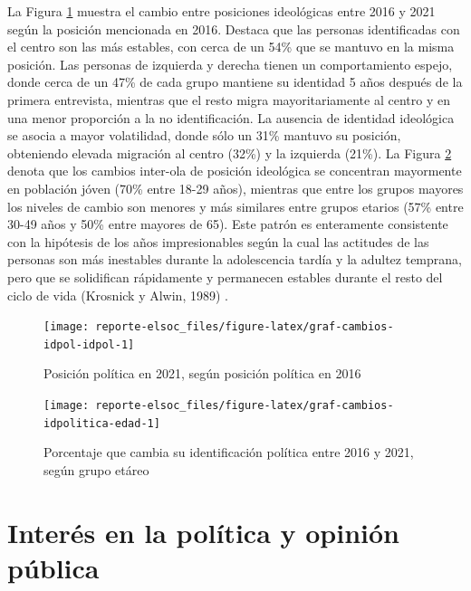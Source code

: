 \documentclass[
  12pt,
]{book}
\begin{document}
La Figura \ref{fig:graf-cambios-idpol-idpol} muestra el cambio entre posiciones ideológicas entre 2016 y 2021 según la posición mencionada en 2016. Destaca que las personas identificadas con el centro son las más estables, con cerca de un 54\% que se mantuvo en la misma posición. Las personas de izquierda y derecha tienen un comportamiento espejo, donde cerca de un 47\% de cada grupo mantiene su identidad 5 años después de la primera entrevista, mientras que el resto migra mayoritariamente al centro y en una menor proporción a la no identificación. La ausencia de identidad ideológica se asocia a mayor volatilidad, donde sólo un 31\% mantuvo su posición, obteniendo elevada migración al centro (32\%) y la izquierda (21\%). La Figura \ref{fig:graf-cambios-idpolitica-edad} denota que los cambios inter-ola de posición ideológica se concentran mayormente en población jóven (70\% entre 18-29 años), mientras que entre los grupos mayores los niveles de cambio son menores y más similares entre grupos etarios (57\% entre 30-49 años y 50\% entre mayores de 65). Este patrón es enteramente consistente con la hipótesis de los años impresionables según la cual las actitudes de las personas son más inestables durante la adolescencia tardía y la adultez temprana, pero que se solidifican rápidamente y permanecen estables durante el resto del ciclo de vida (Krosnick y Alwin, 1989) .

\begin{figure}

{\centering \texttt{[image: reporte-elsoc\_files/figure-latex/graf-cambios-idpol-idpol-1]} 

}

\caption{Posición política en 2021, según posición política en 2016}\label{fig:graf-cambios-idpol-idpol}
\end{figure}

\begin{figure}

{\centering \texttt{[image: reporte-elsoc\_files/figure-latex/graf-cambios-idpolitica-edad-1]} 

}

\caption{Porcentaje que cambia su identificación política entre 2016 y 2021, según grupo etáreo}\label{fig:graf-cambios-idpolitica-edad}
\end{figure}

\hypertarget{interuxe9s-en-la-poluxedtica-y-opiniuxf3n-puxfablica}{%
\section{Interés en la política y opinión pública}\label{interuxe9s-en-la-poluxedtica-y-opiniuxf3n-puxfablica}}
\end{document}
